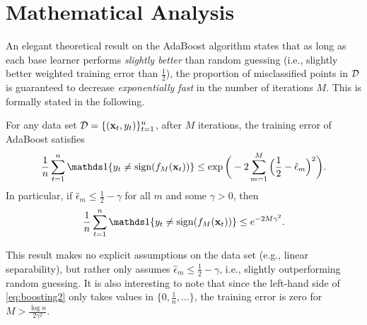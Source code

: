 \documentclass[english]{article}
\begin{document}
\section{Mathematical Analysis} \label{sec:math}

An elegant theoretical result on the AdaBoost algorithm states that as long as each base learner performs {\em slightly better} than random guessing (i.e., slightly better weighted training error than $\frac{1}{2}$), the proportion of misclassified points in $\mathcal{D}$ is guaranteed to decrease {\em exponentially fast} in the number of iterations $M$.  This is formally stated in the following.

\begin{thm} \label{thm:main}
    For any data set $\mathcal{D} = \{(\mathbf{x}_t,y_t)\}_{t=1}^n$, after $M$ iterations, the training error of AdaBoost satisfies
    \begin{equation}
        \frac{1}{n}\sum_{t=1}^n \openone\{ y_t \ne \sign(f_M(\xv_t)) \} \le \exp\bigg( -2\sum_{m=1}^M \Big(\frac{1}{2}-\hat{\epsilon}_m\Big)^2 \bigg). \label{eq:main_result}
    \end{equation}
    In particular, if $\hat{\epsilon}_m \le \frac{1}{2} - \gamma$ for all $m$ and some $\gamma > 0$, then
    \begin{equation}
        \frac{1}{n}\sum_{t=1}^n \openone\{ y_t \ne \sign(f_M(\xv_t)) \}  \le e^{-2M\gamma^2}. \label{eq:boosting2}
    \end{equation}
\end{thm}
This result makes no explicit assumptions on the data set (e.g., linear separability), but rather only assumes $\hat{\epsilon}_m \le \frac{1}{2} - \gamma$, i.e., slightly outperforming random guessing.  It is also interesting to note that since the left-hand side of \eqref{eq:boosting2} only takes values in $\big\{0,\frac{1}{n},\dotsc\big\}$, the training error is zero for $M > \frac{\log n}{2\gamma^2}$.
\end{document}
